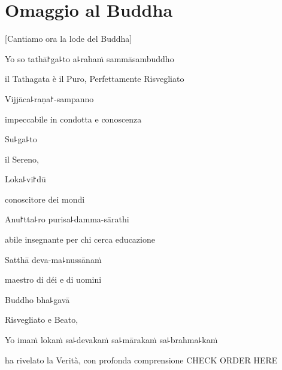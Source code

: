 \clearpage

\chapter{Omaggio al Buddha}

\begin{leader}
\end{leader}

\begin{english}
[Cantiamo ora la lode del Buddha]
\end{english}

Yo so tathā꜓ga꜕to a꜕rahaṁ sammāsambuddho

\begin{english}
il Tathagata è il Puro, Perfettamente Risvegliato
\end{english}

Vijjāca꜕raṇa꜓-sampanno

\begin{english}
impeccabile in condotta e conoscenza
\end{english}

Su꜕ga꜕to

\begin{english}
il Sereno,
\end{english}

Loka꜕vi꜓dū

\begin{english}
conoscitore dei mondi
\end{english}

Anu꜓tta꜕ro purisa꜕damma-sārathi

\begin{english}
abile insegnante per chi cerca educazione
\end{english}

Satthā deva-ma꜕nussānaṁ

\begin{english}
maestro di déi e di uomini
\end{english}

Buddho bha꜕gavā

\begin{english}
Risvegliato e Beato,
\end{english}

Yo imaṁ lokaṁ sa꜕devakaṁ sa꜕mārakaṁ sa꜕brahma꜕kaṁ

\begin{english}
ha rivelato la Verità, con profonda comprensione CHECK ORDER HERE
\end{english}

